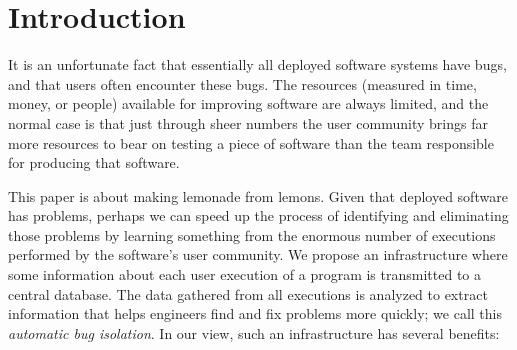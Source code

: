 \section{Introduction}
\label{sec:introduction}

It is an unfortunate fact that essentially all deployed software
systems have bugs, and that users often encounter these bugs.  The
resources (measured in time, money, or people) available for improving
software are always limited, and the normal case is that just through
sheer numbers the user community brings far more resources to bear on
testing a piece of software than the team responsible for producing
that software.

This paper is about making lemonade from lemons.  Given that deployed
software has problems, perhaps we can speed up the process of
identifying and eliminating those problems by learning something from
the enormous number of executions performed by the software's user
community.  We propose an infrastructure where some information about
each user execution of a program is transmitted to a central database.
The data gathered from all executions is analyzed to extract
information that helps engineers find and fix problems more quickly;
we call this {\em automatic bug isolation}.
In our view, such an infrastructure has several benefits:
